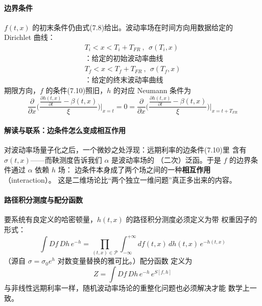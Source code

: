 \paragraph{边界条件}
$f(t,x)$ 的初末条件仍由式(7.8)给出。波动率场在时间方向用数据给定的
Dirichlet 曲线：
\begin{gather*}
T_i<x<T_i+T_{FR}\ ,\ \ \sigma(T_i,x)\\
\text{：给定的初始波动率曲线}\\[4pt]
T_f<x<T_f+T_{FR}\ ,\ \ \sigma(T_f,x)\\
\text{：给定的终末波动率曲线}
\end{gather*}
期限方向，$f$ 的条件(7.10)照旧，$h$ 的对应 Neumann 条件为
\begin{equation*}
\frac{\partial}{\partial x}\biggl(\frac{\frac{\partial h(t,x)}
{\partial t}-\beta(t,x)}{\xi}\biggr)\biggl|_{x=t}=0
=\frac{\partial}{\partial x}\biggl(\frac{\frac{\partial h(t,x)}
{\partial t}-\beta(t,x)}{\xi}\biggr)\biggl|_{x=t+T_{FR}}
\tag{7.61}
\end{equation*}

\paragraph{解读与联系：边条件怎么变成相互作用}
对波动率场量子化之后，一个微妙之处浮现：远期利率的边条件(7.10)里
含有 $\sigma(t,x)$——而鞅测度告诉我们 $\alpha$ 是波动率场的
（二次）泛函。于是 $f$ 的边界条件通过 $\alpha$ 依赖 $h$ 场：
边条件本身成了两个场之间的一种\textbf{相互作用}（interaction）。
这是二维场论比“两个独立一维问题”真正多出来的内容。

\paragraph{路径积分测度与配分函数}
要系统有良定义的哈密顿量，$h(t,x)$ 的路径积分测度必须定义为带
权重因子的形式：
\begin{equation*}
\int Df\,Dh\,e^{-h}=\prod_{(t,x)\in\mathcal{P}}
\int_{-\infty}^{+\infty}df(t,x)\,dh(t,x)\,e^{-h(t,x)}
\tag{7.62}
\end{equation*}
（源自 $\sigma=\sigma_0e^{h}$ 对数变量替换的雅可比。）配分函数
定义为
\begin{equation*}
Z=\int Df\,Dh\,e^{-h}\,e^{S[f,h]}
\tag{7.63}
\end{equation*}
与非线性远期利率一样，随机波动率场论的重整化问题也必须解决才能
数学上一致。

